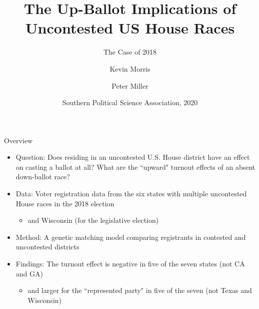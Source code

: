 \documentclass[
  ignorenonframetext,
]{beamer}
\title{The Up-Ballot Implications of Uncontested US House Races}
\subtitle{The Case of 2018}
\author{Kevin Morris \and Peter Miller}
\date{Southern Political Science Association, 2020}
\institute{Brennan Center for Justice}
\providecommand{\tightlist}{%
  \setlength{\itemsep}{0pt}\setlength{\parskip}{0pt}}
\begin{document}
\frame{\titlepage}

\begin{frame}{Overview}
\protect\hypertarget{overview}{}
\begin{itemize}[<+->]
\tightlist
\item
  Question: Does residing in an uncontested U.S. House district have an
  effect on casting a ballot at all? What are the ``upward" turnout
  effects of an absent down-ballot race?
\end{itemize}

\begin{itemize}[<+->]
\tightlist
\item
  Data: Voter registration data from the six states with multiple
  uncontested House races in the 2018 election

  \begin{itemize}[<+->]
  \tightlist
  \item
    and Wisconsin (for the legislative election)
  \end{itemize}
\end{itemize}

\begin{itemize}[<+->]
\tightlist
\item
  Method: A genetic matching model comparing registrants in contested
  and uncontested districts
\end{itemize}

\begin{itemize}[<+->]
\tightlist
\item
  Findings: The turnout effect is negative in five of the seven states
  (not CA and GA)

  \begin{itemize}[<+->]
  \tightlist
  \item
    and larger for the ``represented party" in five of the seven (not
    Texas and Wisconsin)
  \end{itemize}
\end{itemize}
\end{frame}
\end{document}
